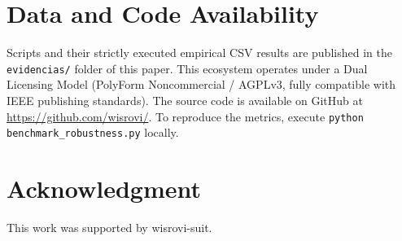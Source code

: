 \documentclass[conference]{IEEEtran}
\begin{document}
\section*{Data and Code Availability}
Scripts and their strictly executed empirical CSV results are published in the \texttt{evidencias/} folder of this paper. This ecosystem operates under a Dual Licensing Model (PolyForm Noncommercial / AGPLv3, fully compatible with IEEE publishing standards). The source code is available on GitHub at \url{https://github.com/wisrovi/}. To reproduce the metrics, execute \texttt{python benchmark\_robustness.py} locally.

\section*{Acknowledgment}
This work was supported by wisrovi-suit.



\end{document}
